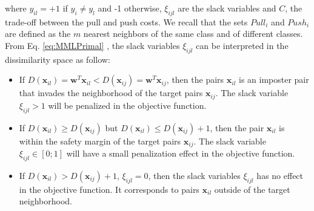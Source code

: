 \noindent where $y_{il} = +1$ if $y_i \neq y_l$ and -1 otherwise, $\xi_{ijl}$ are the slack variables and $C$, the trade-off between the pull and push costs. We recall that the sets $Pull_i$ and $Push_i$ are defined as the $m$ nearest neighbors of the same class and of different classes. From Eq. \ref{eq:MMLPrimal} , the slack variables $\xi_{ijl}$ can  be interpreted in the dissimilarity space as follow:
\begin{itemize}
	\item If $D(\textbf{x}_{il}) = \textbf{w}^T \textbf{x}_{il} < D(\textbf{x}_{ij}) = \textbf{w}^T \textbf{x}_{ij}$, then the pairs $\textbf{x}_{il}$ is an imposter pair that invades the neighborhood of the target pairs $\textbf{x}_{ij}$. The slack variable  $\xi_{ijl} > 1$ will be penalized in the objective function. 
	\item If $D(\textbf{x}_{il}) \geq D(\textbf{x}_{ij})$ but $D(\textbf{x}_{il}) \leq D(\textbf{x}_{ij})+1$, then the pair $\textbf{x}_{il}$ is within the safety margin of the target pairs $\textbf{x}_{ij}$. The slack variable $ \xi_{ijl} \in [0;1]$ will have a small penalization effect in the objective function.
	\item If $D(\textbf{x}_{il}) > D(\textbf{x}_{ij}) +1$, $\xi_{ijl} = 0$, then the slack variables $\xi_{ijl}$ has no effect in the objective function. It corresponds to pairs $\textbf{x}_{il}$ outside of the target neighborhood.
\end{itemize}


